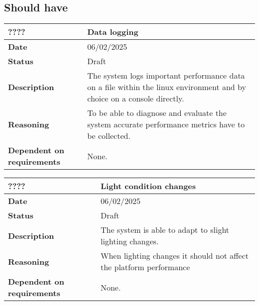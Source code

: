 \documentclass{article}
\begin{document}
\subsection{Should have}
\begin{table}[H]
    \renewcommand{\arraystretch}{1.3}
    \begin{tabular}{|l|p{10cm}|}
        \hline
        \rowcolor{gray!50}
        \textbf{????} & \textbf{Data logging} \\ \hline
        \textbf{Date} & 06/02/2025 \\ \hline
        \textbf{Status} & Draft \\ \hline
        \textbf{Description} & The system logs important performance data on a file within the linux environment and by choice on a console directly. \\ \hline
        \textbf{Reasoning} & To be able to diagnose and evaluate the system accurate performance metrics have to be collected. \\ \hline
        \textbf{Dependent on requirements} & None. \\ \hline
    \end{tabular}
\end{table}




\begin{table}[H]
    \renewcommand{\arraystretch}{1.3}
    \begin{tabular}{|l|p{10cm}|}
        \hline
        \rowcolor{gray!50}
        \textbf{????} & \textbf{Light condition changes} \\ \hline
        \textbf{Date} & 06/02/2025 \\ \hline
        \textbf{Status} & Draft \\ \hline
        \textbf{Description} & The system is able to adapt to slight lighting changes. \\ \hline
        \textbf{Reasoning} & When lighting changes it should not affect the platform performance \\ \hline
        \textbf{Dependent on requirements} & None. \\ \hline
    \end{tabular}
\end{table}
\end{document}
